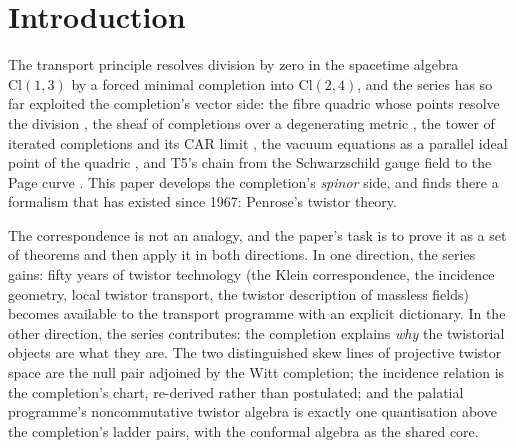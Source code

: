 \documentclass[11pt]{article}
\theoremstyle{definition}
\theoremstyle{plain}
\providecommand{\Cl}{}\renewcommand{\Cl}{\mathrm{Cl}}
\begin{document}
\noindent{}
\newpage

\section{Introduction}

\label{c:note.correspondence.setting-introduction}
The transport principle \cite{ButlerT1} resolves division by zero in the spacetime algebra $\Cl(1,3)$ by a forced minimal completion into $\Cl(2,4)$, and the series has so far exploited the completion's vector side: the fibre quadric whose points resolve the division \cite{ButlerT1}, the sheaf of completions over a degenerating metric \cite{ButlerT4}, the tower of iterated completions and its CAR limit \cite{ButlerT3}, the vacuum equations as a parallel ideal point of the quadric \cite{ButlerT6}, and T5's chain from the Schwarzschild gauge field to the Page curve \cite{ButlerT5}. This paper develops the completion's \emph{spinor} side, and finds there a formalism that has existed since 1967: Penrose's twistor theory.

The correspondence is not an analogy, and the paper's task is to prove it as a set of theorems and then apply it in both directions. In one direction, the series gains: fifty years of twistor technology (the Klein correspondence, the incidence geometry, local twistor transport, the twistor description of massless fields) becomes available to the transport programme with an explicit dictionary. In the other direction, the series contributes: the completion explains \emph{why} the twistorial objects are what they are. The two distinguished skew lines of projective twistor space are the null pair adjoined by the Witt completion; the incidence relation is the completion's chart, re-derived rather than postulated; and the palatial programme's noncommutative twistor algebra is exactly one quantisation above the completion's ladder pairs, with the conformal algebra as the shared core.
\end{document}
